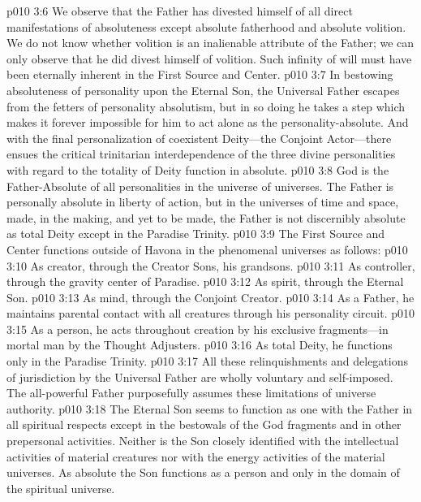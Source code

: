 \vs p010 3:6 We observe that the Father has divested himself of all direct manifestations of absoluteness except absolute fatherhood and absolute volition. We do not know whether volition is an inalienable attribute of the Father; we can only observe that he did  divest himself of volition. Such infinity of will must have been eternally inherent in the First Source and Center.
\vs p010 3:7 In bestowing absoluteness of personality upon the Eternal Son, the Universal Father escapes from the fetters of personality absolutism, but in so doing he takes a step which makes it forever impossible for him to act alone as the personality\hyp{}absolute. And with the final personalization of coexistent Deity---the Conjoint Actor---there ensues the critical trinitarian interdependence of the three divine personalities with regard to the totality of Deity function in absolute.
\vs p010 3:8 God is the Father\hyp{}Absolute of all personalities in the universe of universes. The Father is personally absolute in liberty of action, but in the universes of time and space, made, in the making, and yet to be made, the Father is not discernibly absolute as total Deity except in the Paradise Trinity.
\pc \vs p010 3:9 The First Source and Center functions outside of Havona in the phenomenal universes as follows:
\pc \vs p010 3:10 \bibnobreakspace As creator, through the Creator Sons, his grandsons.
\vs p010 3:11 \bibnobreakspace As controller, through the gravity center of Paradise.
\vs p010 3:12 \bibnobreakspace As spirit, through the Eternal Son.
\vs p010 3:13 \bibnobreakspace As mind, through the Conjoint Creator.
\vs p010 3:14 \bibnobreakspace As a Father, he maintains parental contact with all creatures through his personality circuit.
\vs p010 3:15 \bibnobreakspace As a person, he acts  throughout creation by his exclusive fragments---in mortal man by the Thought Adjusters.
\vs p010 3:16 \bibnobreakspace As total Deity, he functions only in the Paradise Trinity.
\pc \vs p010 3:17 All these relinquishments and delegations of jurisdiction by the Universal Father are wholly voluntary and self\hyp{}imposed. The all\hyp{}powerful Father purposefully assumes these limitations of universe authority.
\pc \vs p010 3:18 The Eternal Son seems to function as one with the Father in all spiritual respects except in the bestowals of the God fragments and in other prepersonal activities. Neither is the Son closely identified with the intellectual activities of material creatures nor with the energy activities of the material universes. As absolute the Son functions as a person and only in the domain of the spiritual universe.

